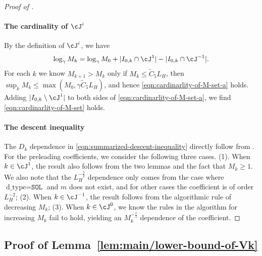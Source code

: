 \begin{proof}[Proof of ]
    \paragraph{The cardinality of $\cJ^i$}
    By the definition of $\cJ^i$, we have 
    \begin{align*}
    \log_\gamma M_k = \log_\gamma M_0  + |I_{0,k} \cap \cJ^1|-|I_{0,k} \cap \cJ^{-1}|.
    \end{align*}
    For each $k$ we know $M_{k+1} > M_k$ only if $M_k \leq \tilde C_5 L_H$, 
    then $\sup_{k} M_k \leq \max(M_0, \gamma \tilde C_5 L_H)$, 
    and hence \eqref{eqn:cardinarlity-of-M-set-a} holds.
    Adding $|I_{0,k} \setminus \cJ^1|$ to both sides of \eqref{eqn:cardinarlity-of-M-set-a}, we find
    \eqref{eqn:cardinarlity-of-M-set} holds.

    \paragraph{The descent inequality}
    The $D_k$ dependence in \eqref{eqn:summarized-descent-inequality} directly follow from .
     For the preleading coefficients, we consider the following three cases.
     (1). When $k \in \cJ^1$, the result also follows from the two lemmas and the fact that $M_k \geq 1$.
     We also note that the $L_H^{-\frac{5}{2}}$ dependence only comes from the case where $\text{d\_type} = \texttt{SOL}$ and $m$ does not exist, and for other cases the coefficient is of order $L_H^{-2}$;
     (2). When $k \in \cJ^{-1}$, the result follows from the algorithmic rule of decreasing $M_k$;
     (3). When $k \in \cJ^0$,
     we know the rules in the algorithm for increasing $M_k$ fail to hold, yielding an $M_k^{-\frac{1}{2}}$ dependence of the coefficient.
\end{proof}

\subsection{Proof of Lemma~\ref{lem:main/lower-bound-of-Vk}}
\label{sec:appendix/proof-lower-bound-of-Vk}

